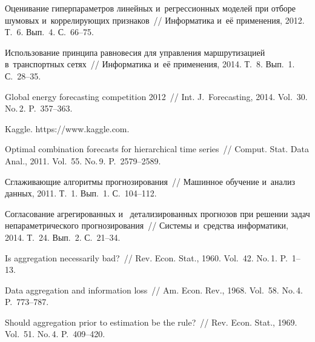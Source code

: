 \begin{multicols}{2}


{\small\frenchspacing
 {%
 \begin{thebibliography}{99}



 Оценивание
    гиперпараметров линейных и~регрессионных моделей при отборе
    шумовых и~коррелирующих признаков~// Информатика и~её
    применения, 2012. Т.~6. Вып.~4. С.~66--75.



 Использование принципа равновесия для
    управления маршрутизацией в~транспортных сетях~// Информатика
    и~её применения, 2014. Т.~8. Вып.~1. С.~28--35.



 Global energy forecasting competition 2012~// Int.
    J.~Forecasting, 2014. Vol.~30. No.\,2. P.~357--363.

    Kaggle. {\sf https://www.kaggle.com}.

 Optimal
    combination forecasts for hierarchical time series~// Comput.
    Stat. Data Anal., 2011. Vol.~55. No.\,9. P.~2579--2589.

 Сглаживающие алгоритмы прогнозирования~// Машинное
    обучение и~анализ данных, 2011. Т.~1. Вып.~1. С.~104--112.

 Согласование агрегированных и~    детализированных прогнозов при решении задач непараметрического
    прогнозирования~//
    Системы и~средства информатики, 2014. Т.~24. Вып.~2. С.~21--34.

 Is aggregation necessarily bad?~// Rev. Econ.
Stat., 1960. Vol.~42. No.\,1. P.~1--13.

Data aggregation and information loss~// Am. Econ. Rev., 1968. Vol.~58. No.\,4. P.~773--787.

 Should aggregation prior to estimation be the rule?~//
Rev. Econ. Stat., 1969. Vol.~51. No.\,4. P.~409--420.


\end{thebibliography}}}
\end{multicols}
